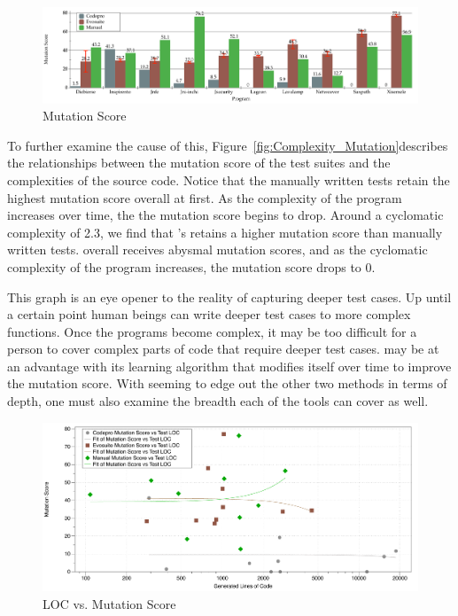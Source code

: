 \begin{figure}[!t]
\centering
  \includegraphics[width=\textwidth]{Mutation_Score}
    \caption{Mutation Score}
  \label{fig:Mutation_Score}
\end{figure}

To further examine the cause of this, Figure~\ref{fig:Complexity_Mutation}describes the relationships between the mutation score of the test suites and the complexities of the source code. Notice that the manually written tests retain the highest mutation score overall at first. As the complexity of the program increases over time, the the mutation score begins to drop. Around a cyclomatic complexity of 2.3, we find that \evo's retains a higher mutation score than manually written tests. \codepro overall receives abysmal mutation scores, and as the cyclomatic complexity of the program increases, the mutation score drops to 0.

This graph is an eye opener to the reality of capturing deeper test cases. Up until a certain point human beings can write deeper test cases to more complex functions. Once the programs become complex, it may be too difficult for a person to cover complex parts of code that require deeper test cases. \evo may be at an advantage with its learning algorithm that modifies itself over time to improve the mutation score. With \evo seeming to edge out the other two methods in terms of depth, one must also examine the breadth each of the tools can cover as well.

\begin{figure}[!t]
\centering
  \includegraphics[width=\textwidth]{LOC_Mutation}
    \caption{LOC vs. Mutation Score}
  \label{fig:LOC_Mutation}
\end{figure}


